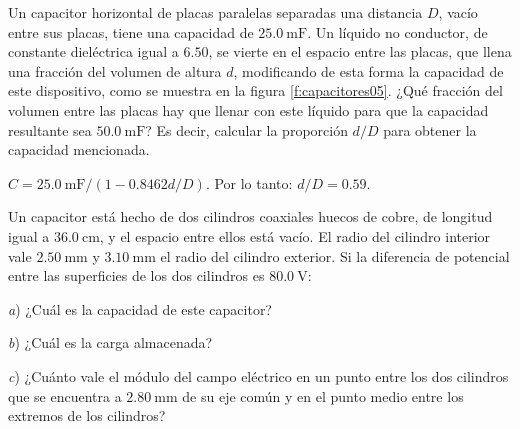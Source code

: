 %
\begin{Exercise}\label{p:capacitores05}
  Un capacitor horizontal de placas paralelas separadas una distancia $D$, vacío entre sus placas, tiene una capacidad de $\SI{25.0}{\milli\farad}$. Un líquido no conductor, de constante dieléctrica igual a $6.50$, se vierte en el espacio entre las placas, que llena una fracción del volumen de altura $d$, modificando de esta forma la capacidad de este dispositivo, como se muestra en la figura \ref{f:capacitores05}. ¿Qué fracción del volumen entre las placas hay que llenar con este líquido para que la capacidad resultante sea $\SI{50.0}{\milli\farad}$? Es decir, calcular la proporción $d/D$ para obtener la capacidad mencionada.
\end{Exercise}
\begin{Answer}
    \begin{minipage}[t]{.4\textwidth}
      $C = \SI{25.0}{\milli\farad}/(1 - 0.8462d/D)$. Por lo tanto: $d/D = 0.59$.
    \end{minipage}
\end{Answer}
%
\begin{center}
\end{center}
%
\begin{Exercise}
  Un capacitor está hecho de dos cilindros coaxiales huecos de cobre, de longitud igual a $\SI{36.0}{\centi\metre}$, y el espacio entre ellos está vacío. El radio del cilindro interior vale $\SI{2.50}{\milli\metre}$ y $\SI{3.10}{\milli\metre}$ el radio del cilindro exterior. Si la diferencia de potencial entre las superficies de los dos cilindros es $\SI{80.0}{\volt}$:\par
  \textit{a}) ¿Cuál es la capacidad de este capacitor?\par
  \textit{b}) ¿Cuál es la carga almacenada?\par
  \textit{c}) ¿Cuánto vale el módulo del campo eléctrico en un punto entre los dos cilindros que se encuentra a $\SI{2.80}{\milli\metre}$ de su eje común y en el punto medio entre los extremos de los cilindros?
\end{Exercise}
